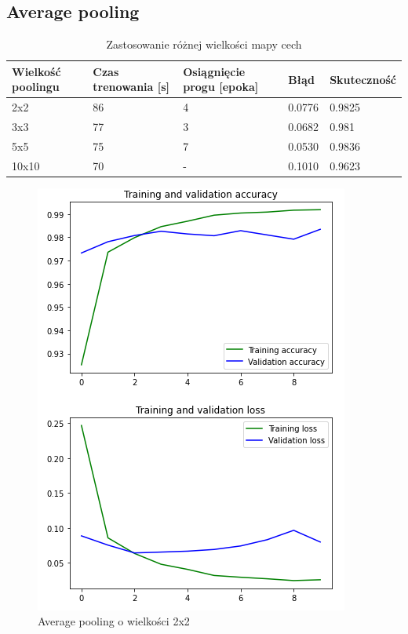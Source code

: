 \documentclass{article}
\begin{document}
\subsection{Average pooling}

\begin{table}[h]
  \centering
    
  \bgroup
  \def\arraystretch{1.3}
\begin{tabular}{|l|l|l|l|l|}
\hline
Wielkość poolingu & Czas trenowania [s] & Osiągnięcie progu [epoka] & Błąd & Skuteczność \\ \hline
2x2 & 86 & 4 & 0.0776 & 0.9825 \\ \hline
3x3 & 77 & 3 & 0.0682 & 0.981 \\ \hline
5x5 & 75 & 7 & 0.0530 & 0.9836 \\ \hline
10x10 & 70 & - & 0.1010 & 0.9623 \\ \hline
\end{tabular}
  \egroup
  \vspace{10pt}
  \caption{Zastosowanie różnej wielkości mapy cech}
\end{table}

\begin{figure}[h]
  \centering
  \includegraphics[width=\linewidth]{pooling_2_2.png}
  \caption{Average pooling o wielkości 2x2}
\end{figure}
\end{document}
